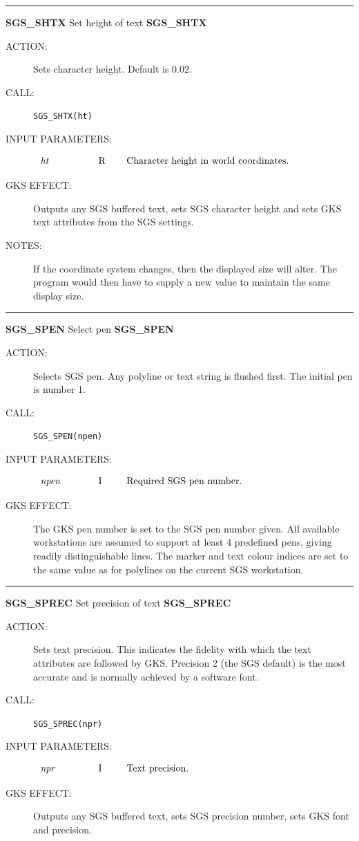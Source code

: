 \documentclass[11pt]{article}
\newcommand{\xlabel}[1]{}
\newcommand{\rthead}[2]{\rule{\textwidth}{0.3mm}
{\Large {\bf #1} \hfill #2 \hfill {\bf #1}}}
\newenvironment{params}%
{\[\begin{tabular}{p{0.14\textwidth}p{0.05\textwidth}p{0.66\textwidth}}}%
{\end{tabular}\]}
\newcommand{\rparams}[3]{{\em #1} &#2 &#3\\}
\newcommand{\rthead}[2]{\subsection{\label{#1}\xlabel{#1}#1 - #2}}
\newenvironment{params}{\begin{description}}{\end{description}}
\newcommand{\rparams}[3]{\item{{\em #1}} (#2) #3}
\begin{document}
\rthead{SGS\_SHTX}{Set height of text}
\begin{description}
\item [ACTION:]
Sets character height.
Default is 0.02.
\item [CALL:]
{\tt SGS\_SHTX(ht)}
\item [INPUT PARAMETERS:]
\begin{params}
\rparams{ht}{R}{Character height in world coordinates.}
\end{params}
\item [GKS EFFECT:]
Outputs any SGS buffered text, sets SGS character height and sets GKS text
attributes from the SGS settings.
\item [NOTES:]
If the coordinate system changes, then the displayed size will alter.
The program would then have to supply a new value to maintain the same display
size.
\end{description}
\goodbreak

\rthead{SGS\_SPEN}{Select pen}
\begin{description}
\item [ACTION:]
Selects SGS pen.
Any polyline or text string is flushed first.
The initial pen is number 1.
\item [CALL:]
{\tt SGS\_SPEN(npen)}
\item [INPUT PARAMETERS:]
\begin{params}
\rparams{npen}{I}{Required SGS pen number.}
\end{params}
\item [GKS EFFECT:]
The GKS pen number is set to the SGS pen number given.
All available workstations are assumed to support at least 4 predefined pens,
giving readily distinguishable lines.
The marker and text colour indices are set to the same value as for polylines on
the current SGS workstation.
\end{description}
\goodbreak

\rthead{SGS\_SPREC}{Set precision of text}
\begin{description}
\item [ACTION:]
Sets text precision.
This indicates the fidelity with which the text attributes are followed by GKS.
Precision 2 (the SGS default) is the most accurate and is normally achieved by
a software font.
\item [CALL:]
{\tt SGS\_SPREC(npr)}
\item [INPUT PARAMETERS:]
\begin{params}
\rparams{npr}{I}{Text precision.}
\end{params}
\item [GKS EFFECT:]
Outputs any SGS buffered text, sets SGS precision number, sets GKS font and
precision.
\end{description}
\goodbreak
\end{document}
